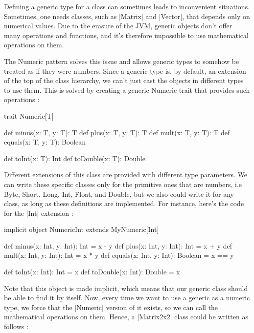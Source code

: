 Defining a generic type for a class can sometimes leads to inconvenient situations. Sometimes, one needs classes, such as |Matrix| and |Vector|, that depends only on numerical values. Due to the erasure of the JVM, generic objects don't offer many operations and functions, and it's therefore impossible to use mathematical operations on them.

The Numeric pattern solves this issue and allows generic types to somehow be treated as if they were numbers. Since a generic type is, by default, an extension of the top of the class hierarchy, we can't just cast the objects in different types to use them. This is solved by creating a generic Numeric trait that provides such operations :

\begin{lstlisting-nobreak}
 trait Numeric[T] {
   def minus(x: T, y: T): T
   def plus(x: T, y: T): T
   def mult(x: T, y: T): T
   def equals(x: T, y: T): Boolean
   
   def toInt(x: T): Int
   def toDouble(x: T): Double
 }
\end{lstlisting-nobreak}

Different extensions of this class are provided with different type parameters. We can write these specific classes only for the primitive ones that are numbers, i.e Byte, Short, Long, Int, Float, and Double, but we also could write it for any class, as long as these definitions are implemented. For instance, here's the code for the |Int| extension :

\begin{lstlisting-nobreak}
 implicit object NumericInt extends MyNumeric[Int] {
   def minus(x: Int, y: Int): Int = x - y
   def plus(x: Int, y: Int): Int = x + y
   def mult(x: Int, y: Int): Int = x * y
   def equals(x: Int, y: Int): Boolean = x == y
   
   def toInt(x: Int): Int = x
   def toDouble(x: Int): Double = x
 }
\end{lstlisting-nobreak}

Note that this object is made implicit, which means that our generic class should be able to find it by itself. Now, every time we want to use a generic as a numeric type, we force that the |Numeric| version of it exists, so we can call the mathematical operations on them. Hence, a |Matrix2x2| class could be written as follows :

